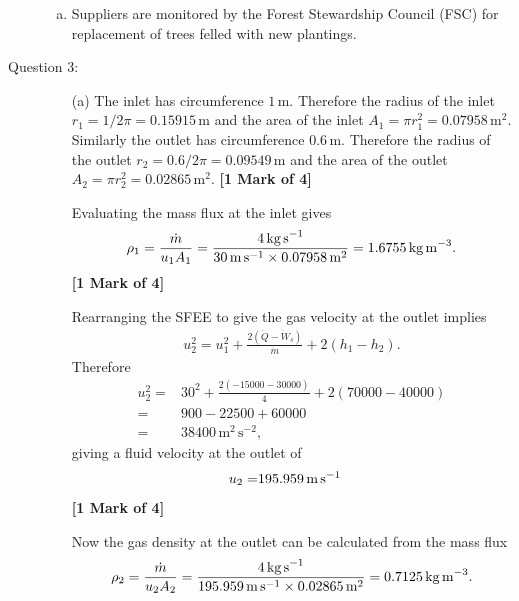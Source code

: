 \documentclass[12pt,twoside]{report}
\begin{document}
\begin{description}
\begin{enumerate}[(a)]
\item Suppliers are monitored by the Forest Stewardship Council (FSC) for replacement of trees felled with new plantings.

\end{enumerate}

\clearpage

\item [Question 3:]


\begin{itemize}
\item[(a)] The inlet has circumference $1$\,m. Therefore the radius of the inlet $r_1 = 1 / 2\pi = 0.15915$\,m and the area of the inlet $A_1 = \pi r_1^2 = 0.07958$\,m$^2$.\\
Similarly the outlet has circumference $0.6$\,m. Therefore the radius of the outlet $r_2 = 0.6/ 2\pi = 0.09549$\,m and the area of the outlet $A_2 = \pi r_2^2 = 0.02865$\,m$^2$.  \hfill \textbf{[1 Mark of 4]}


Evaluating the mass flux at the inlet gives
\begin{align*}
 \rho_1 = \frac{\dot{m}}{u_1 A_1} = \frac{4\,\mbox{kg\,s}^{-1}}{30\,\mbox{m\,s}^{-1} \times 0.07958\,\mbox{m}^2} = 1.6755\,\mbox{kg\,m}^{-3}.
\end{align*} \hfill \textbf{[1 Mark of 4]}

Rearranging the SFEE to give the gas velocity at the outlet implies
\begin{align*}
 u_2^2 = u_1^2 + \frac{2\left(\dot{Q} - \dot{W}_s\right)}{\dot{m}} + 2\left(h_1 - h_2\right).
\end{align*}
Therefore
\begin{align*}
 u_2^2 =& 30^2 + \frac{2\left(-15000 - 30000\right)}{4} + 2\left(70000 - 40000\right) \nonumber \\
 =& 900 - 22500 + 60000 \nonumber \\
 =& 38400\,\mbox{m}^2\,\mbox{s}^{-2},
\end{align*}
giving a fluid velocity at the outlet of
\begin{align*}
 u_2 =& 195.959\,\mbox{m\,s}^{-1}
\end{align*} \hfill \textbf{[1 Mark of 4]}

Now the gas density at the outlet can be calculated from the mass flux
\begin{align*}
 \rho_2 = \frac{\dot{m}}{u_2 A_2} = \frac{4\,\mbox{kg\,s}^{-1}}{195.959\,\mbox{m\,s}^{-1} \times 0.02865\,\mbox{m}^2} = 0.7125\,\mbox{kg\,m}^{-3}.
\end{align*} 


\end{itemize}
\end{description}
\end{document}
